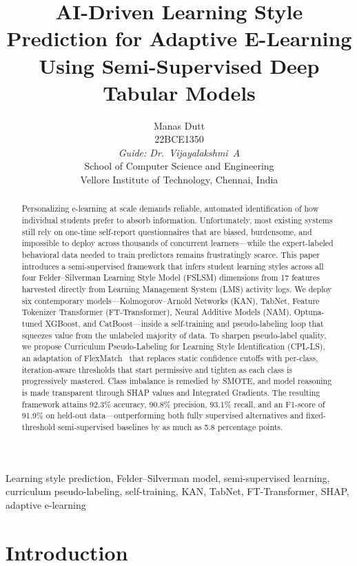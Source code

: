 \documentclass[journal, onecolumn]{IEEEtran}
\title{AI-Driven Learning Style Prediction for Adaptive E-Learning Using Semi-Supervised Deep Tabular Models}
\author{
    \begin{tabular}[t]{c}Manas Dutt \\ \small 22BCE1350\end{tabular}
    \hspace{1.5em}

    \textit{Guide: Dr.~Vijayalakshmi~A} \\
    School of Computer Science and Engineering \\
    Vellore Institute of Technology, Chennai, India
}
\begin{document}
\maketitle

\begin{abstract}
Personalizing e-learning at scale demands reliable, automated identification of how individual students prefer to absorb information. Unfortunately, most existing systems still rely on one-time self-report questionnaires that are biased, burdensome, and impossible to deploy across thousands of concurrent learners---while the expert-labeled behavioral data needed to train predictors remains frustratingly scarce. This paper introduces a semi-supervised framework that infers student learning styles across all four Felder--Silverman Learning Style Model (FSLSM) dimensions from 17 features harvested directly from Learning Management System (LMS) activity logs. We deploy six contemporary models---Kolmogorov--Arnold Networks (KAN), TabNet, Feature Tokenizer Transformer (FT-Transformer), Neural Additive Models (NAM), Optuna-tuned XGBoost, and CatBoost---inside a self-training and pseudo-labeling loop that squeezes value from the unlabeled majority of data. To sharpen pseudo-label quality, we propose Curriculum Pseudo-Labeling for Learning Style Identification (CPL-LS), an adaptation of FlexMatch~\cite{zhang2021flexmatch} that replaces static confidence cutoffs with per-class, iteration-aware thresholds that start permissive and tighten as each class is progressively mastered. Class imbalance is remedied by SMOTE, and model reasoning is made transparent through SHAP values and Integrated Gradients. The resulting framework attains 92.3\% accuracy, 90.8\% precision, 93.1\% recall, and an F1-score of 91.9\% on held-out data---outperforming both fully supervised alternatives and fixed-threshold semi-supervised baselines by as much as 5.8 percentage points.
\end{abstract}

\begin{IEEEkeywords}
Learning style prediction, Felder--Silverman model, semi-supervised learning, curriculum pseudo-labeling, self-training, KAN, TabNet, FT-Transformer, SHAP, adaptive e-learning
\end{IEEEkeywords}

\section{Introduction}
\end{document}
